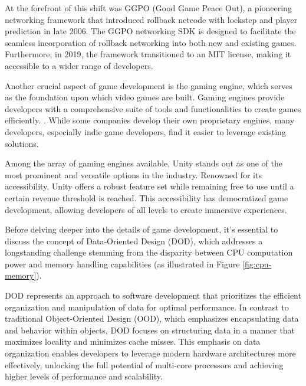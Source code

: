 At the forefront of this shift was GGPO (Good Game Peace Out), a pioneering networking framework that introduced rollback netcode with lockstep and player prediction in late 2006. The GGPO networking SDK is designed to facilitate the seamless incorporation of rollback networking into both new and existing games. Furthermore, in 2019, the framework transitioned to an MIT license, making it accessible to a wider range of developers. \cite{GGPO_page}\newline

Another crucial aspect of game development is the gaming engine, which serves as the foundation upon which video games are built. Gaming engines provide developers with a comprehensive suite of tools and functionalities to create games efficiently. \cite{Game_engines_comparison}. While some companies develop their own proprietary engines, many developers, especially indie game developers, find it easier to leverage existing solutions.\newline

Among the array of gaming engines available, Unity stands out as one of the most prominent and versatile options in the industry. Renowned for its accessibility, Unity offers a robust feature set while remaining free to use until a certain revenue threshold is reached. This accessibility has democratized game development, allowing developers of all levels to create immersive experiences. \newline

Before delving deeper into the details of game development, it's essential to discuss the concept of Data-Oriented Design (DOD), which addresses a longstanding challenge stemming from the disparity between CPU computation power and memory handling capabilities (as illustrated in Figure \ref{fig:cpu-memory}).

DOD represents an approach to software development that prioritizes the efficient organization and manipulation of data for optimal performance. In contrast to traditional Object-Oriented Design (OOD), which emphasizes encapsulating data and behavior within objects, DOD focuses on structuring data in a manner that maximizes locality and minimizes cache misses. This emphasis on data organization enables developers to leverage modern hardware architectures more effectively, unlocking the full potential of multi-core processors and achieving higher levels of performance and scalability.

